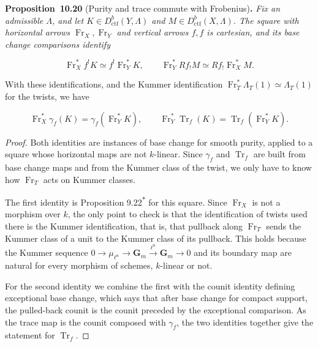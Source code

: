 \documentclass[11pt]{article}
\newenvironment{bpstatement}[2]{\par\addvspace{0.6\baselineskip}\noindent\textbf{#1}#2\textbf{.}\enspace\ignorespaces}
  {\par\addvspace{0.4\baselineskip}}
\newenvironment{bpstatementit}[2]{\begin{bpstatement}{#1}{#2}\itshape\ignorespaces}{\end{bpstatement}}
\newcommand{\bpout}[1]{#1\textsuperscript{\hyperlink{bp-outside}{\ensuremath{\ast}}}}
\begin{document}
\label{bp62}%
\begin{bpstatementit}{Proposition~10.20}{ (Purity and trace commute with Frobenius)}
Fix an admissible \(\Lambda\), and let \(K\in D^b_{\mathrm{ctf}}(Y,\Lambda)\) and \(M\in D^b_{\mathrm{ctf}}(X,\Lambda)\). The square with horizontal arrows \(\operatorname{Fr}_X,\operatorname{Fr}_Y\) and vertical arrows \(f,f\) is cartesian, and its base change comparisons identify

\[
\operatorname{Fr}_X^*f^!K
\simeq f^!\operatorname{Fr}_Y^*K,
\qquad
\operatorname{Fr}_Y^*Rf_!M
\simeq Rf_!\operatorname{Fr}_X^*M.
\tag{10.9}
\]

With these identifications, and the Kummer identification \(\operatorname{Fr}_T^*\Lambda_T(1)\simeq\Lambda_T(1)\) for the twists, we have

\[
\operatorname{Fr}_X^*\gamma_f(K)
=\gamma_f(\operatorname{Fr}_Y^*K),
\qquad
\operatorname{Fr}_Y^*\operatorname{Tr}_f(K)
=\operatorname{Tr}_f(\operatorname{Fr}_Y^*K).
\]
\end{bpstatementit}

\begin{proof}[{Proof}]\label{bp63}%
Both identities are instances of base change for smooth purity, applied to a square whose horizontal maps are not \(k\)-linear. Since \(\gamma_f\) and \(\operatorname{Tr}_f\) are built from base change maps and from the Kummer class of the twist, we only have to know how \(\operatorname{Fr}_T\) acts on Kummer classes.

The first identity is Proposition \bpout{9.22} for this square. Since \(\operatorname{Fr}_X\) is not a morphism over \(k\), the only point to check is that the identification of twists used there is the Kummer identification, that is, that pullback along \(\operatorname{Fr}_T\) sends the Kummer class of a unit to the Kummer class of its pullback. This holds because the Kummer sequence \(0\to\mu_{\ell^n}\to\mathbf G_m\xrightarrow{\ell^n}\mathbf G_m\to0\) and its boundary map are natural for every morphism of schemes, \(k\)-linear or not.

For the second identity we combine the first with the counit identity defining exceptional base change, which says that after base change for compact support, the pulled-back counit is the counit preceded by the exceptional comparison. As the trace map is the counit composed with \(\gamma_f\), the two identities together give the statement for \(\operatorname{Tr}_f\).
\end{proof}
\end{document}
